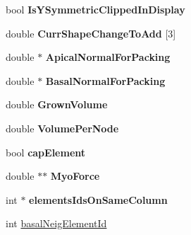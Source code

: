 \begin{DoxyCompactItemize}
\item 
\hypertarget{classShapeBase_ab7376a727388707fc2502490701e48a0}{}bool {\bfseries Is\+Y\+Symmetric\+Clipped\+In\+Display}\label{classShapeBase_ab7376a727388707fc2502490701e48a0}

\item 
\hypertarget{classShapeBase_a3d48903871978d77a77cb77f569975c0}{}double {\bfseries Curr\+Shape\+Change\+To\+Add} \mbox{[}3\mbox{]}\label{classShapeBase_a3d48903871978d77a77cb77f569975c0}

\item 
\hypertarget{classShapeBase_ab84cbf988437cd20fcceee7a24d0c3a8}{}double $\ast$ {\bfseries Apical\+Normal\+For\+Packing}\label{classShapeBase_ab84cbf988437cd20fcceee7a24d0c3a8}

\item 
\hypertarget{classShapeBase_a87f03cc35ac66eeb14487c5f33097891}{}double $\ast$ {\bfseries Basal\+Normal\+For\+Packing}\label{classShapeBase_a87f03cc35ac66eeb14487c5f33097891}

\item 
\hypertarget{classShapeBase_a8a1bafcaf21f040dd137abfe434a75a9}{}double {\bfseries Grown\+Volume}\label{classShapeBase_a8a1bafcaf21f040dd137abfe434a75a9}

\item 
\hypertarget{classShapeBase_a59943ecb9f8ec139c0f564c1fb91d876}{}double {\bfseries Volume\+Per\+Node}\label{classShapeBase_a59943ecb9f8ec139c0f564c1fb91d876}

\item 
\hypertarget{classShapeBase_a21420915ac7c8444e0e5b5f4e98d7322}{}bool {\bfseries cap\+Element}\label{classShapeBase_a21420915ac7c8444e0e5b5f4e98d7322}

\item 
\hypertarget{classShapeBase_a3aedc120b16a922ee9b0c1595630694b}{}double $\ast$$\ast$ {\bfseries Myo\+Force}\label{classShapeBase_a3aedc120b16a922ee9b0c1595630694b}

\item 
\hypertarget{classShapeBase_af234eba58e529b7ce1514b334057b099}{}int $\ast$ {\bfseries elements\+Ids\+On\+Same\+Column}\label{classShapeBase_af234eba58e529b7ce1514b334057b099}

\item 
\hypertarget{classShapeBase_a7515f99cadce806894a7c254186a85f7}{}int \hyperlink{classShapeBase_a7515f99cadce806894a7c254186a85f7}{basal\+Neig\+Element\+Id}\label{classShapeBase_a7515f99cadce806894a7c254186a85f7}


\end{DoxyCompactItemize}
